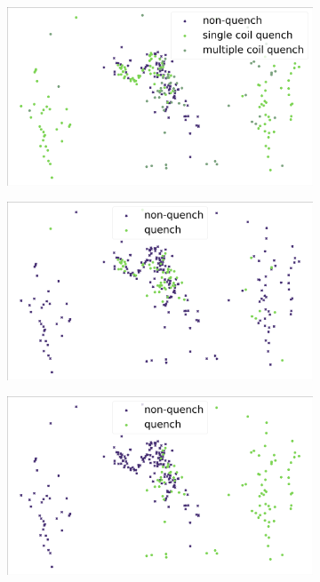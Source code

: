 \begin{figure}[!h]
	\centering
	\begin{subfigure}{\linewidth}
		\includegraphics[width=\linewidth]{img/quench_dist_qlp/single_vs_multiple_Bn.png}
		\subcaption{}
	\end{subfigure}
	\begin{subfigure}{0.49\linewidth}
		\includegraphics[width=\linewidth]{img/quench_dist_qlp/quenches_coil_0_Bn.png}
		\subcaption{}
	\end{subfigure}
	\begin{subfigure}{0.49\linewidth}
		\includegraphics[width=\linewidth]{img/quench_dist_qlp/quenches_coil_1_Bn.png}

\end{subfigure}
\end{figure}
